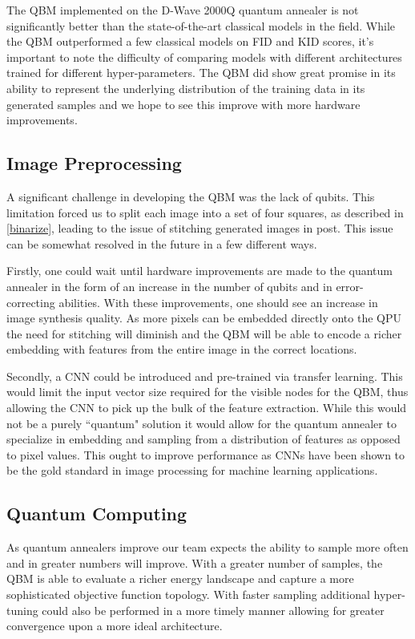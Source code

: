 \documentclass[%
 reprint,
 amsmath,amssymb,
 aps,
]{revtex4-2}
\begin{document}
The QBM implemented on the D-Wave 2000Q quantum annealer is not significantly better than the state-of-the-art classical models in the field. While the QBM outperformed a few classical models on FID and KID scores, it's important to note the difficulty of comparing models with different architectures trained for different hyper-parameters. The QBM did show great promise in its ability to represent the underlying distribution of the training data in its generated samples and we hope to see this improve with more hardware improvements.

\subsection{Image Preprocessing}
A significant challenge in developing the QBM was the lack of qubits. This limitation forced us to split each image into a set of four squares, as described in \ref{binarize}, leading to the issue of stitching generated images in post. This issue can be somewhat resolved in the future in a few different ways.


Firstly, one could wait until hardware improvements are made to the quantum annealer in the form of an increase in the number of qubits and in error-correcting abilities. With these improvements, one should see an increase in image synthesis quality. As more pixels can be embedded directly onto the QPU the need for stitching will diminish and the QBM will be able to encode a richer embedding with features from the entire image in the correct locations.


Secondly, a CNN could be introduced and pre-trained via transfer learning. This would limit the input vector size required for the visible nodes for the QBM, thus allowing the CNN to pick up the bulk of the feature extraction. While this would not be a purely ``quantum" solution it would allow for the quantum annealer to specialize in embedding and sampling from a distribution of features as opposed to pixel values. This ought to improve performance as CNNs have been shown to be the gold standard in image processing for machine learning applications.

\subsection{Quantum Computing}
As quantum annealers improve our team expects the ability to sample more often and in greater numbers will improve. With a greater number of samples, the QBM is able to evaluate a richer energy landscape and capture a more sophisticated objective function topology. With faster sampling additional hyper-tuning could also be performed in a more timely manner allowing for greater convergence upon a more ideal architecture.
\end{document}
